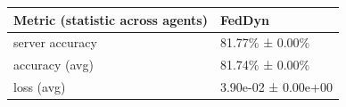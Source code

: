 \begin{tabular}{ll}
\hline
 Metric (statistic across agents)   & FedDyn              \\
\hline
 server accuracy                    & 81.77\% ± 0.00\%      \\
 accuracy (avg)                     & 81.74\% ± 0.00\%      \\
 loss (avg)                         & 3.90e-02 ± 0.00e+00 \\
\hline
\end{tabular}